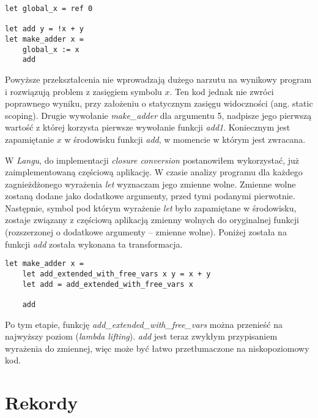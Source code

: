 \documentclass[declaration,shortabstract]{iithesis}
\begin{document}
\begin{lstlisting}[frame=single, caption={Wprowadzenie globalnej zmiennej.}]
let global_x = ref 0

let add y = !x + y 
let make_adder x = 
    global_x := x
    add 
\end{lstlisting}
Powyższe przekształcenia nie wprowadzają dużego narzutu na wynikowy program i rozwiązują 
problem z zasięgiem symbolu $x$. Ten kod jednak nie zwróci poprawnego wyniku, przy założeniu o statycznym zasięgu widoczności (ang. static scoping). Drugie 
wywołanie \textit{make\_adder} dla argumentu 5, nadpisze jego pierwszą wartość z której korzysta
pierwsze wywołanie funkcji \textit{add1}. Koniecznym jest zapamiętanie $x$ w środowisku funkcji 
\textit{add}, w momencie w którym jest zwracana. 

W \textit{Langu}, do implementacji \textit{closure conversion} postanowiłem wykorzystać,
już zaimplementowaną częściową aplikację. W czasie analizy programu dla każdego 
zagnieżdżonego wyrażenia \textit{let} wyznaczam jego zmienne wolne. Zmienne wolne
zostaną dodane jako dodatkowe argumenty, przed tymi podanymi pierwotnie.
Następnie, symbol pod którym wyrażenie \textit{let} było zapamiętane w 
środowisku, zostaje związany z częściową aplikacją zmienny wolnych 
do oryginalnej funkcji (rozszerzonej o dodatkowe argumenty -- zmienne wolne).
Poniżej została na funkcji \textit{add} została wykonana ta transformacja.

\begin{lstlisting}[frame=single, caption={Wprowadzenie globalnej zmiennej.}]
let make_adder x = 
    let add_extended_with_free_vars x y = x + y
    let add = add_extended_with_free_vars x

    add
\end{lstlisting}

Po tym etapie, funkcję \textit{add\_extended\_with\_free\_vars} można przenieść 
na najwyższy poziom (\textit{lambda lifting}). \textit{add} jest teraz zwykłym 
przypisaniem wyrażenia do zmiennej, więc może być łatwo przetłumaczone na 
niskopoziomowy kod.




\section{Rekordy}
\end{document}
